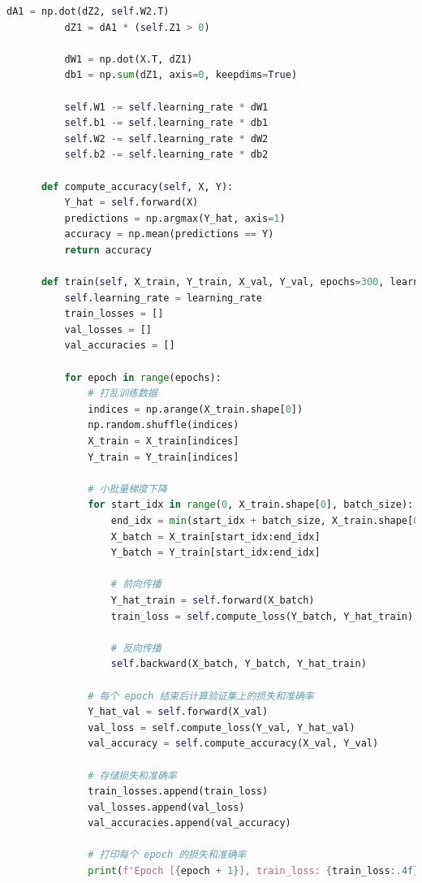 \documentclass[12pt]{article}
\begin{document}
\begin{lstlisting}[language=Python]
          dA1 = np.dot(dZ2, self.W2.T)
          dZ1 = dA1 * (self.Z1 > 0)
  
          dW1 = np.dot(X.T, dZ1)
          db1 = np.sum(dZ1, axis=0, keepdims=True)
  
          self.W1 -= self.learning_rate * dW1
          self.b1 -= self.learning_rate * db1
          self.W2 -= self.learning_rate * dW2
          self.b2 -= self.learning_rate * db2
  
      def compute_accuracy(self, X, Y):
          Y_hat = self.forward(X)
          predictions = np.argmax(Y_hat, axis=1)
          accuracy = np.mean(predictions == Y)
          return accuracy
  
      def train(self, X_train, Y_train, X_val, Y_val, epochs=300, learning_rate=0.01):
          self.learning_rate = learning_rate
          train_losses = []
          val_losses = []
          val_accuracies = []
  
          for epoch in range(epochs):
              # 打乱训练数据
              indices = np.arange(X_train.shape[0])
              np.random.shuffle(indices)
              X_train = X_train[indices]
              Y_train = Y_train[indices]
  
              # 小批量梯度下降
              for start_idx in range(0, X_train.shape[0], batch_size):
                  end_idx = min(start_idx + batch_size, X_train.shape[0])
                  X_batch = X_train[start_idx:end_idx]
                  Y_batch = Y_train[start_idx:end_idx]
  
                  # 前向传播
                  Y_hat_train = self.forward(X_batch)
                  train_loss = self.compute_loss(Y_batch, Y_hat_train)
                  
                  # 反向传播
                  self.backward(X_batch, Y_batch, Y_hat_train)
  
              # 每个 epoch 结束后计算验证集上的损失和准确率
              Y_hat_val = self.forward(X_val)
              val_loss = self.compute_loss(Y_val, Y_hat_val)
              val_accuracy = self.compute_accuracy(X_val, Y_val)
              
              # 存储损失和准确率
              train_losses.append(train_loss)
              val_losses.append(val_loss)
              val_accuracies.append(val_accuracy)
              
              # 打印每个 epoch 的损失和准确率
              print(f'Epoch [{epoch + 1}], train_loss: {train_loss:.4f}, val_loss: {val_loss:.4f}, val_acc: {val_accuracy:.4f}')
          

\end{lstlisting}
\end{document}
